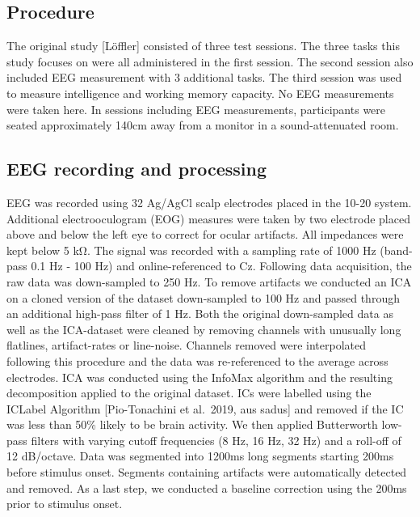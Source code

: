 \documentclass[
  man,floatsintext]{apa7}
\begin{document}
\hypertarget{procedure}{%
\subsection{Procedure}\label{procedure}}

The original study {[}Löffler{]} consisted of three test sessions. The three tasks this study focuses on were all administered in the first session. The second session also included EEG measurement with 3 additional tasks. The third session was used to measure intelligence and working memory capacity. No EEG measurements were taken here. In sessions including EEG measurements, participants were seated approximately 140cm away from a monitor in a sound-attenuated room.

\hypertarget{eeg-recording-and-processing}{%
\subsection{EEG recording and processing}\label{eeg-recording-and-processing}}

EEG was recorded using 32 Ag/AgCl scalp electrodes placed in the 10-20 system. Additional electrooculogram (EOG) measures were taken by two electrode placed above and below the left eye to correct for ocular artifacts. All impedances were kept below 5 kΩ. The signal was recorded with a sampling rate of 1000 Hz (band-pass 0.1 Hz - 100 Hz) and online-referenced to Cz. Following data acquisition, the raw data was down-sampled to 250 Hz. To remove artifacts we conducted an ICA on a cloned version of the dataset down-sampled to 100 Hz and passed through an additional high-pass filter of 1 Hz. Both the original down-sampled data as well as the ICA-dataset were cleaned by removing channels with unusually long flatlines, artifact-rates or line-noise. Channels removed were interpolated following this procedure and the data was re-referenced to the average across electrodes. ICA was conducted using the InfoMax algorithm and the resulting decomposition applied to the original dataset. ICs were labelled using the ICLabel Algorithm {[}Pio-Tonachini et al.~2019, aus sadus{]} and removed if the IC was less than 50\% likely to be brain activity. We then applied Butterworth low-pass filters with varying cutoff frequencies (8 Hz, 16 Hz, 32 Hz) and a roll-off of 12 dB/octave. Data was segmented into 1200ms long segments starting 200ms before stimulus onset. Segments containing artifacts were automatically detected and removed. As a last step, we conducted a baseline correction using the 200ms prior to stimulus onset.
\end{document}
